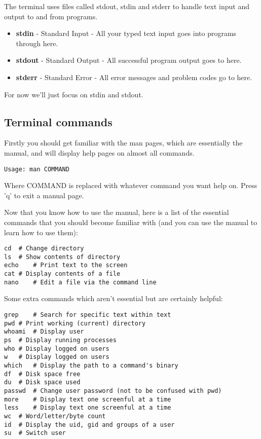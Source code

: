 \documentclass{article}
\begin{document}
The terminal uses files called stdout, stdin and stderr to handle text input and output to and from programs.

\begin{itemize}
\item \textbf{stdin} - Standard Input - All your typed text input goes into programs through here.
\item \textbf{stdout} - Standard Output - All successful program output goes to here.
\item \textbf{stderr} - Standard Error - All error messages and problem codes go to here. 
\end{itemize}
For now we'll just focus on stdin and stdout.

\subsection{Terminal commands}
Firstly you should get familiar with the man pages, which are essentially the manual, and will display help pages on almost all commands.
\begin{verbatim}
Usage: man COMMAND
\end{verbatim}
Where COMMAND is replaced with whatever command you want help on. Press 'q' to exit a manual page.

Now that you know how to use the manual, here is a list of the essential commands that you should become familiar with (and you can use the manual to learn how to use them): 
\begin{verbatim}
cd	# Change directory
ls	# Show contents of directory
echo	# Print text to the screen
cat	# Display contents of a file
nano	# Edit a file via the command line
\end{verbatim}
Some extra commands which aren't essential but are certainly helpful:
\begin{verbatim}
grep	# Search for specific text within text
pwd	# Print working (current) directory
whoami	# Display user
ps	# Display running processes
who	# Display logged on users
w	# Display logged on users
which	# Display the path to a command's binary
df	# Disk space free
du	# Disk space used
passwd	# Change user password (not to be confused with pwd)
more	# Display text one screenful at a time
less	# Display text one screenful at a time
wc	# Word/letter/byte count
id	# Display the uid, gid and groups of a user
su	# Switch user
\end{verbatim}
\end{document}
